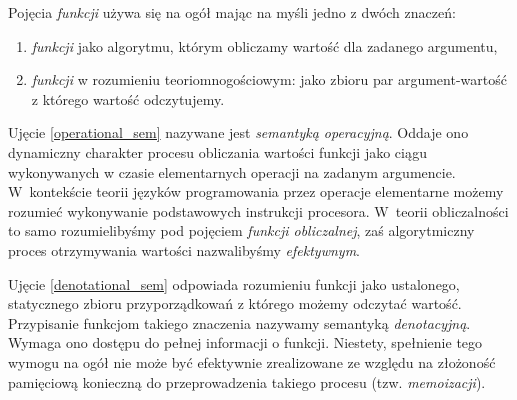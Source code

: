Pojęcia \emph{funkcji} używa się na ogół mając na myśli jedno z dwóch znaczeń:
\begin{enumerate}[label=(\arabic*)]
  \setlength\itemsep{0em}
  \item \emph{funkcji} jako algorytmu, którym obliczamy wartość dla zadanego argumentu,\label{operational_sem}
  \item \emph{funkcji} w rozumieniu teoriomnogościowym: jako zbioru par ar\-gu\-ment-wartość z którego wartość odczytujemy.
\label{denotational_sem}
\end{enumerate}
Ujęcie \ref{operational_sem} nazywane jest \emph{semantyką operacyjną}. Oddaje ono dynamiczny charakter procesu obliczania wartości funkcji jako ciągu wykonywanych w czasie elementarnych operacji na zadanym argumencie. W~kontekście teorii języków programowania przez operacje elementarne możemy rozumieć wykonywanie podstawowych instrukcji procesora. W~teorii obliczalności to samo rozumielibyśmy pod pojęciem \emph{funkcji obliczalnej}, zaś algorytmiczny proces otrzymywania wartości nazwalibyśmy \emph{efektywnym}.

Ujęcie \ref{denotational_sem} odpowiada rozumieniu funkcji jako ustalonego, statycznego zbioru przyporządkowań z którego możemy odczytać wartość. Przypisanie funkcjom takiego znaczenia nazywamy semantyką \emph{denotacyjną}. Wymaga ono dostępu do pełnej informacji o funkcji. Niestety, spełnienie tego wymogu na ogół nie może być efektywnie zrealizowane ze względu na złożoność pamięciową konieczną do przeprowadzenia takiego procesu (tzw. \emph{memoizacji}).

